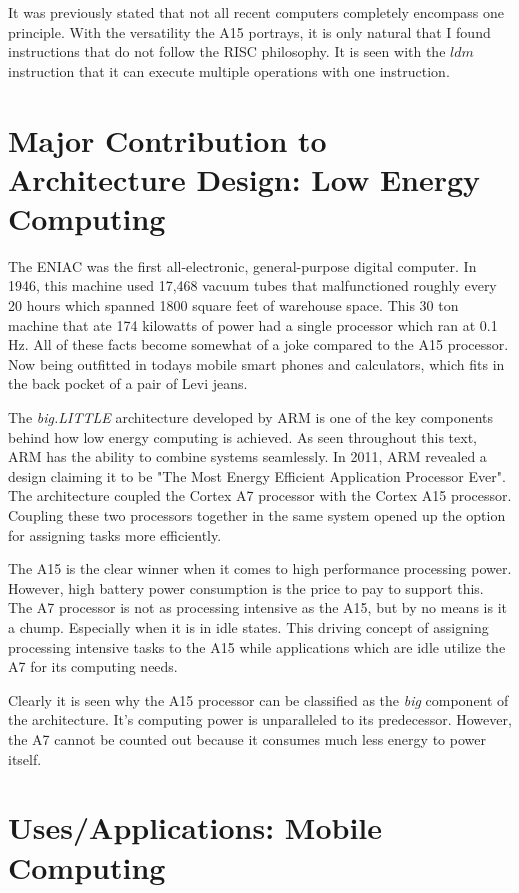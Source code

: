 \documentclass[12pt]{scrreprt}
\begin{document}
	It was previously stated that not all recent computers completely encompass one principle.
	With the versatility the A15 portrays, it is only natural that I found instructions that do not follow the RISC philosophy.
	It is seen with the $ldm$ instruction that it can execute multiple operations with one instruction.

\chapter{Major Contribution to Architecture Design: Low Energy Computing}

	The ENIAC was the first all-electronic, general-purpose digital computer.
	In 1946, this machine used 17,468 vacuum tubes that malfunctioned roughly every 20 hours which spanned 1800 square feet of warehouse space.
	This 30 ton machine that ate 174 kilowatts of power had a single processor which ran at 0.1 Hz.
	All of these facts become somewhat of a joke compared to the A15 processor.
	Now being outfitted in todays mobile smart phones and calculators, which fits in the back pocket of a pair of Levi jeans.
	
	The \textit{big.LITTLE} architecture developed by ARM is one of the key components behind how low energy computing is achieved.
	As seen throughout this text, ARM has the ability to combine systems seamlessly.
	In 2011, ARM revealed a design claiming it to be "The Most Energy Efficient Application Processor Ever".
	The architecture coupled the Cortex A7 processor with the Cortex A15 processor.
	Coupling these two processors together in the same system opened up the option for assigning tasks more efficiently.

	The A15 is the clear winner when it comes to high performance processing power.
	However, high battery power consumption is the price to pay to support this.
	The A7 processor is not as processing intensive as the A15, but by no means is it a chump.
	Especially when it is in idle states.
	This driving concept of assigning processing intensive tasks to the A15 while applications which are idle utilize the A7 for its computing needs.

	Clearly it is seen why the A15 processor can be classified as the \textit{big} component of the architecture.
	It's computing power is unparalleled to its predecessor.
	However, the A7 cannot be counted out because it consumes much less energy to power itself.

{\let\clearpage\relax\chapter{Uses/Applications: Mobile Computing}}
\end{document}
